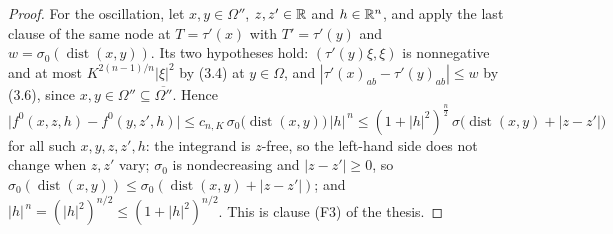 \begin{proof}
For the oscillation, let $x,y\in\Omega''$, $z,z'\in\mathbb{R}$ and $h\in\mathbb{R}^n$, and apply
the last clause of the same node at $T=\tau'(x)$ with $T'=\tau'(y)$ and
$w=\sigma_0(\operatorname{dist}(x,y))$.  Its two hypotheses hold: $(\tau'(y)\xi,\xi)$
is nonnegative and at most $K^{2(n-1)/n}|\xi|^2$ by (3.4) at $y\in\Omega$, and
$|\tau'(x)_{ab}-\tau'(y)_{ab}|\le w$ by (3.6), since
$x,y\in\Omega''\subseteq\overline{\Omega''}$.  Hence
\[
\bigl|f^0(x,z,h)-f^0(y,z',h)\bigr|
\le c_{n,K}\,\sigma_0\bigl(\operatorname{dist}(x,y)\bigr)\,|h|^{\,n}
\le(1+|h|^2)^{\frac n2}\,\sigma\bigl(\operatorname{dist}(x,y)+|z-z'|\bigr)
\tag{3.10}
\]
for all such $x,y,z,z',h$: the integrand is $z$-free, so the left-hand side does
not change when $z,z'$ vary; $\sigma_0$ is nondecreasing and $|z-z'|\ge0$, so
$\sigma_0(\operatorname{dist}(x,y))\le\sigma_0(\operatorname{dist}(x,y)+|z-z'|)$;
and $|h|^{\,n}=(|h|^2)^{n/2}\le(1+|h|^2)^{n/2}$.  This is clause
(F3) of the thesis.


\end{proof}
